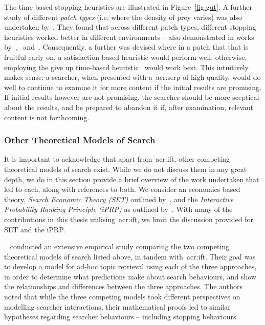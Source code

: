 The time based stopping heuristics are illustrated in Figure~\ref{fig:gut}. A further study of different \emph{patch types} (i.e. where the density of prey varies) was also undertaken by~\cite{mcnair1982gut_mvt}. They found that across different patch types, different stopping heuristics worked better in different environments -- also demonstrated in works by~\cite{iwasa1981prey_distribution},~\cite{mcnair1982gut_mvt} and~\cite{green1984oft_stopping}. Consequently, a further  was devised where in a patch that that is fruitful early on, a satisfaction based heuristic would perform well; otherwise, employing the give up time-based heuristic~\citep{krebs1974leave_after_rule} would work best. This intuitively makes sense: a searcher, when presented with a~\gls{acr:serp} of high quality, would do well to continue to examine it for more content if the initial results are promising. If initial results however are not promising, the searcher should be more sceptical about the results, and be prepared to abandon it if, after examination, relevant content is not forthcoming.

\subsubsection{Other Theoretical Models of Search}\label{sec:stopping_background:models:theoretical:other}
It is important to acknowledge that apart from~\gls{acr:ift}, other competing theoretical models of search exist. While we do not discuss them in any great depth, we do in this section provide a brief overview of the work undertaken that led to each, along with references to both. We consider an economics based theory, \emph{Search Economic Theory (SET)} outlined by~\cite{azzopardi2011economics}, and the \emph{Interactive Probability Ranking Principle (iPRP)} as outlined by~\cite{fuhr2008iprp}. With many of the contributions in this thesis utilising~\gls{acr:ift}, we limit the discussion provided for SET and the iPRP.

\noindent
{}~\cite{azzopardi2015theories} conducted an extensive empirical study comparing the two competing theoretical models of search listed above, in tandem with~\gls{acr:ift}. Their goal was to develop a model for ad-hoc topic retrieval using each of the three approaches, in order to determine what predictions make about search behaviours, and show the relationships and differences between the three approaches. The authors noted that while the three competing models took different perspectives on modelling searcher interactions, their mathematical proofs led to similar hypotheses regarding searcher behaviours -- including stopping behaviours.

